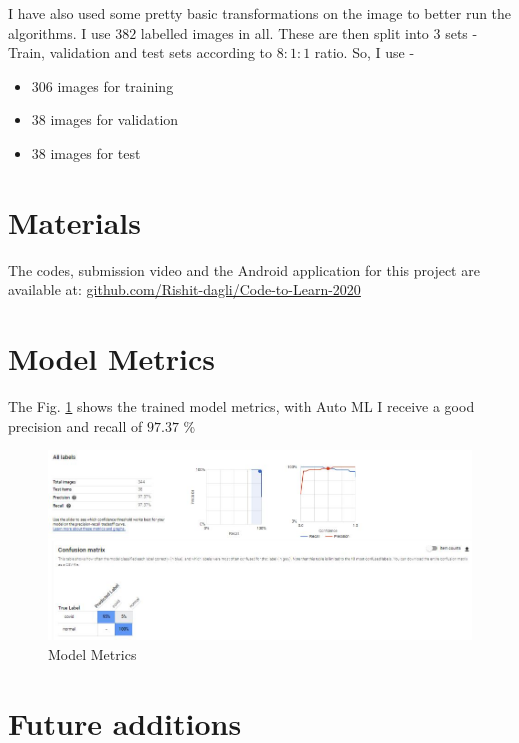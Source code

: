 \documentclass[a4paper]{article}
\begin{document}
\qquad I have also used some pretty basic transformations on the image to better run the algorithms. I use $382$ labelled images in all. These are then split into $3$ sets - Train, validation and test sets according to $8:1:1$ ratio. So, I use -
\begin{itemize}
    \item $306$ images for training
    \item $38$ images for validation
    \item $38$ images for test
\end{itemize}

\section{Materials}

\qquad The codes, submission video and the Android application for this project are available at: \cite{CodeToLearnGH} \href{https://github.com/Rishit-dagli/Code-to-Learn-2020}{github.com/Rishit-dagli/Code-to-Learn-2020}

\section{Model Metrics}

The Fig. \ref{fig:1} shows the trained model metrics, with Auto ML I receive a good precision and recall of $97.37$ \%

\begin{figure}[h!]
  \centering
  \includegraphics[width=\linewidth]{metrics.JPG}
  \caption{Model Metrics}
  \label{fig:1}
\end{figure}

\section{Future additions}
\end{document}
